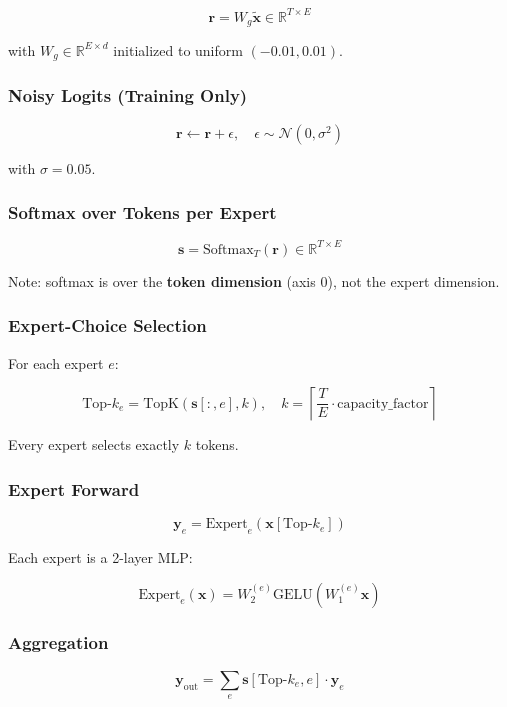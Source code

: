 \[
\mathbf{r} = W_g \tilde{\mathbf{x}} \in \mathbb{R}^{T \times E}
\tag{4.6}
\]

with $W_g \in \mathbb{R}^{E \times d}$ initialized to uniform $(-0.01, 0.01)$.

\subsubsection{Noisy Logits (Training Only)}

\[
\mathbf{r} \leftarrow \mathbf{r} + \epsilon, \quad \epsilon \sim \mathcal{N}(0, \sigma^2)
\tag{4.7}
\]

with $\sigma = 0.05$.

\subsubsection{Softmax over Tokens per Expert}

\[
\mathbf{s} = \text{Softmax}_T(\mathbf{r}) \in \mathbb{R}^{T \times E}
\tag{4.8}
\]

Note: softmax is over the \textbf{token dimension} (axis 0), not the expert 
dimension.

\subsubsection{Expert-Choice Selection}

For each expert $e$:

\[
\text{Top-}k_e = \text{TopK}\!\left(\mathbf{s}[:, e], k\right), \quad
k = \left\lceil \frac{T}{E} \cdot \text{capacity\_factor} \right\rceil
\tag{4.9}
\]

Every expert selects exactly $k$ tokens.

\subsubsection{Expert Forward}

\[
\mathbf{y}_e = \text{Expert}_e\!\left(\mathbf{x}[\text{Top-}k_e]\right)
\tag{4.10}
\]

Each expert is a 2-layer MLP:

\[
\text{Expert}_e(\mathbf{x}) = W_2^{(e)} \text{GELU}(W_1^{(e)} \mathbf{x})
\tag{4.11}
\]

\subsubsection{Aggregation}

\[
\mathbf{y}_{\text{out}} = \sum_e \mathbf{s}[\text{Top-}k_e, e] \cdot \mathbf{y}_e
\tag{4.12}
\]

